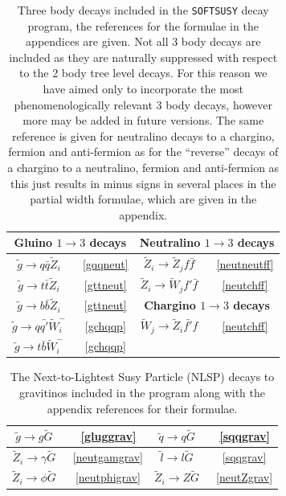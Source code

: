 \documentclass[final,3p,times,pdflatex]{elsarticle}
\begin{document}
\begin{center}
\begin{table}
\centering
\begin{tabular}{|c|c|c|c|} \hline
\multicolumn{2}{|c|}{\bf{Gluino $1 \rightarrow 3$ decays} } & \multicolumn{2}{c|}{\bf{Neutralino $1 \rightarrow 3 $ decays} } \\ \hline
$\tilde{g} \rightarrow q \bar{q} \tilde{Z}_i$ &~\ref{gqqneut} & $\tilde{Z}_i \rightarrow \tilde{Z}_j f \bar{f}$ &~\ref{neutneutff} \\ \hline
$\tilde{g} \rightarrow t \bar{t} \tilde{Z}_i$ &~\ref{gttneut} & $\tilde{Z}_i \rightarrow \tilde{W}_j f' \bar{f}$ &~\ref{neutchff} \\ \hline
$\tilde{g} \rightarrow b \bar{b} \tilde{Z}_i$ &~\ref{gttneut} & \multicolumn{2}{c|}{\bf{Chargino $1 \rightarrow 3 $ decays} } \\ \hline
$\tilde{g} \rightarrow q \bar{q'} \tilde{W}_i^-$ &~\ref{gchqqp} & $\tilde{W}_j \rightarrow \tilde{Z}_i \bar{f'} f$ &~\ref{neutchff} \\ \hline
$\tilde{g} \rightarrow t \bar{b} \tilde{W}_i^-$ &~\ref{gchqqp} & & \\ \hline
\end{tabular}
\caption{Three body decays included in the {\tt SOFTSUSY} decay program, the
  references for the formulae in the appendices are given. Not all 3 body
  decays are included as they are naturally suppressed with respect to the 2
  body tree level decays. For this reason we have aimed only to incorporate
  the most phenomenologically relevant 3 body decays, however more may be
  added in future versions. The same reference is given for neutralino decays
  to a chargino, fermion and anti-fermion as for the ``reverse'' decays of a
  chargino to a neutralino, fermion and anti-fermion as this just results in
  minus signs in several places in the partial width formulae, which are given
  in the appendix.} 
\label{1to3decaysreftable}
\end{table}
\end{center}
\begin{center}
\begin{table}
\centering
\begin{tabular}{|c|c|c|c|} \hline
$\tilde{g} \rightarrow g \tilde{G}$ &~\ref{gluggrav} & $\tilde{q} \rightarrow q \tilde{G}$ &~\ref{sqqgrav} \\ \hline
$\tilde{Z}_i \rightarrow \gamma \tilde{G}$ &~\ref{neutgamgrav} & $\tilde{l} \rightarrow l \tilde{G}$ &~\ref{sqqgrav} \\ \hline
$\tilde{Z}_i \rightarrow \phi \tilde{G}$ &~\ref{neutphigrav} & $\tilde{Z}_i \rightarrow Z \tilde{G}$ &~\ref{neutZgrav} \\ \hline 
\end{tabular}
\caption{The Next-to-Lightest Susy Particle (NLSP) decays to gravitinos included in the program along with the appendix references for their formulae.}
\label{Gravitinodecaysreftable}
\end{table}
\end{center}
\end{document}
